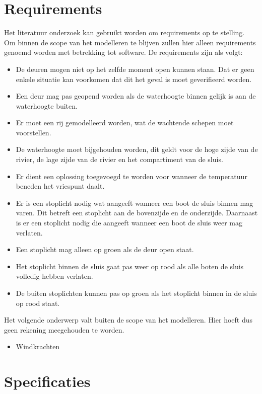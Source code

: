 \documentclass{article}
\begin{document}
\section{Requirements} %
Het literatuur onderzoek kan gebruikt worden om requirements op te stelling. Om binnen de scope van het modelleren te blijven zullen hier alleen requirements genoemd worden met betrekking tot software. De requirements zijn als volgt:
\begin{itemize}
\item De deuren mogen niet op het zelfde moment open kunnen staan. Dat er geen enkele situatie kan voorkomen dat dit het geval is moet geverifieerd worden.
\item Een deur mag pas geopend worden als de waterhoogte binnen gelijk is aan de waterhoogte buiten.
\item Er moet een rij gemodelleerd worden, wat de wachtende schepen moet voorstellen.
\item De waterhoogte moet bijgehouden worden, dit geldt voor de hoge zijde van de rivier, de lage zijde van de rivier en het compartiment van de sluis.
\item Er dient een oplossing toegevoegd te worden voor wanneer de temperatuur beneden het vriespunt daalt.
\item Er is een stoplicht nodig wat aangeeft wanneer een boot de sluis binnen mag varen. Dit betreft een stoplicht aan de bovenzijde en de onderzijde. Daarnaast is er een stoplicht nodig die aangeeft wanneer een boot de sluis weer mag verlaten.
\\\item Een stoplicht mag alleen op groen als de deur open staat.
\\\item Het stoplicht binnen de sluis gaat pas weer op rood als alle boten de sluis volledig hebben verlaten.
\\\item De buiten stoplichten kunnen pas op groen als het stoplicht binnen in de sluis op rood staat.

\end{itemize}

Het volgende onderwerp valt buiten de scope van het modelleren. Hier hoeft dus geen rekening meegehouden te worden.
\begin{itemize}
\item Windkrachten
\end{itemize}

\section{Specificaties} %
\end{document}
